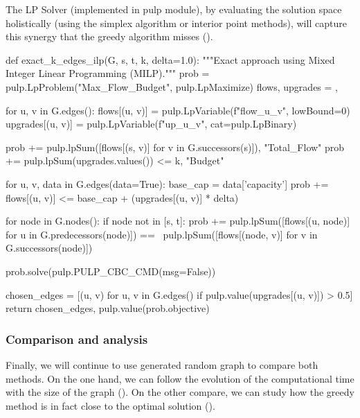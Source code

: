 \documentclass[12pt, openany]{article}
\begin{document}
The LP Solver (implemented in pulp module), by evaluating the solution space holistically (using the simplex algorithm or interior point methods), will capture this synergy that the greedy algorithm misses ().

\begin{python}[caption={Python code for the greedy approach in order to identify the sequence of $k$ edges under budget constraint},  label={lst:3_ilp_method_lst}]
def exact_k_edges_ilp(G, s, t, k, delta=1.0):
    """Exact approach using Mixed Integer Linear Programming (MILP)."""
    prob = pulp.LpProblem("Max_Flow_Budget", pulp.LpMaximize)
    flows, upgrades = {}, {}
    
    for u, v in G.edges():
        flows[(u, v)] = pulp.LpVariable(f"flow_{u}_{v}", lowBound=0)
        upgrades[(u, v)] = pulp.LpVariable(f"up_{u}_{v}", cat=pulp.LpBinary)
        
    prob += pulp.lpSum([flows[(s, v)] for v in G.successors(s)]), "Total_Flow"
    prob += pulp.lpSum(upgrades.values()) <= k, "Budget"
    
    for u, v, data in G.edges(data=True):
        base_cap = data['capacity']
        prob += flows[(u, v)] <= base_cap + (upgrades[(u, v)] * delta)
        
    for node in G.nodes():
        if node not in [s, t]:
            prob += pulp.lpSum([flows[(u, node)] for u in G.predecessors(node)]) == \
                    pulp.lpSum([flows[(node, v)] for v in G.successors(node)])
            
    prob.solve(pulp.PULP_CBC_CMD(msg=False))
    
    chosen_edges = [(u, v) for u, v in G.edges() if pulp.value(upgrades[(u, v)]) > 0.5]
    return chosen_edges, pulp.value(prob.objective)
\end{python}

\subsubsection{Comparison and analysis}

Finally, we will continue to use generated random graph to compare both methods. On the one hand, we can follow the evolution of the computational time with the size of the graph (). On the other compare, we can study how the greedy method is in fact close to the optimal solution ().
\end{document}
